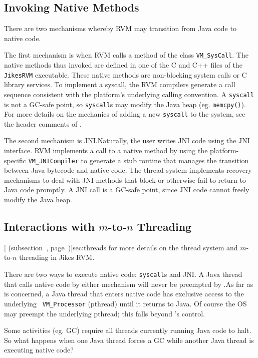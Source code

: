\subsection{Invoking Native Methods}
There are two mechanisms whereby RVM may transition from Java code to native
code.

%
The first mechanism is when RVM calls a method of the class {\tt VM\_SysCall}.
The native methods thus invoked are defined in one of the
C and C++ files of the {\tt JikesRVM} executable. 
These native methods are non-blocking system calls or C library 
services.  To implement a syscall, the RVM compilers generate a call
sequence consistent with the platform's underlying calling convention.
A {\tt syscall} is not a GC-safe point, so {\tt syscall}s may modify the
Java heap (eg. {\tt memcpy()}). For more details on the mechanics of adding a
new \texttt{syscall} to the system, see the header comments of 
.

The second mechanism is JNI.\@  Naturally, the user writes JNI code
using the JNI interface.  RVM implements a call to a native method by
using the platform-specific {\tt VM\_JNICompiler} to generate a stub
routine that manages the transition between Java bytecode and native code.  The
thread system implements recovery mechanisms to deal with JNI methods
that block or otherwise fail to return to Java code promptly.  A JNI call
is a GC-safe point, since JNI code cannot freely modify the Java heap.

\subsection{Interactions with $m$-to-$n$ Threading}
[ (subsection~\Ref,
page~\Pageref)]{sec:threads} for more details on the thread system
and $m$-to-$n$ threading in Jikes RVM.\@ 

There are two ways to execute native code: {\tt syscall}s and JNI.\@
A Java thread that calls native code by either mechanism will never
be preempted by \jrvm{}.\@  As far as \jrvm{} is concerned, a Java thread that
enters native code has exclusive access to the underlying {\tt
VM\_Processor} (pthread) until it returns to Java.  Of course the OS may preempt the underlying
pthread; this falls beyond \jrvm{}'s control.

Some activities (eg. GC) require all threads currently running Java code to halt.  
So what happens when one Java thread forces a GC while another Java thread is
executing native code?

